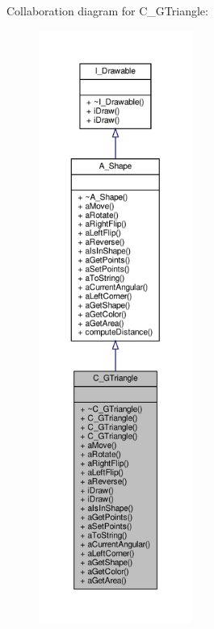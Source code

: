 Collaboration diagram for C\+\_\+\+G\+Triangle\+:
\nopagebreak
\begin{figure}[H]
\begin{center}
\leavevmode
\includegraphics[height=550pt]{classC__GTriangle__coll__graph}
\end{center}
\end{figure}
